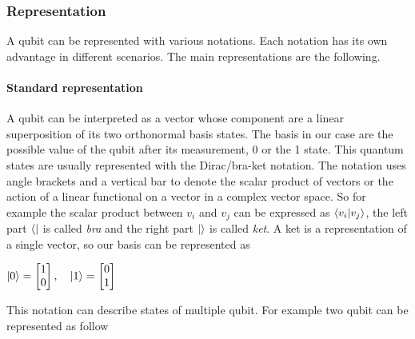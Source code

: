\documentclass[main.tex]{subfiles}
\theoremstyle{definition}
\begin{document}
		\subsubsection{Representation}
		A qubit can be represented with various notations. Each notation has its own advantage in different scenarios. 
		The main representations are the following.
		\paragraph{Standard representation}
		A qubit can be interpreted as a vector whose component are a linear superposition of its two orthonormal basis states. 
		The	basis in our case are the possible value of the qubit after its measurement, 0 or the 1 state. 
		This quantum states are usually represented with the Dirac/bra-ket notation.
		The notation uses angle brackets and a vertical bar to denote the scalar product of vectors or the action of a linear 
		functional on a vector in a complex vector space. So for example the scalar product between $v_i$ and $v_j$ can be expressed
	 	as $\braket{v_i|v_j}$, the left part $\bra{}$ is called \textit{bra} and the right part $\ket{}$ is called \textit{ket}. A
	 	ket is a representation of a single vector, so our basis can be represented as 
		\begin{center}
		$\ket{0} = 
		\begin{bmatrix}
           1 \\
           0
        \end{bmatrix},\quad
        \ket{1} = 
		\begin{bmatrix}
           0 \\
           1
        \end{bmatrix}$
		\end{center}
        This notation can describe states of multiple qubit. For example two qubit can be represented as follow
\end{document}
